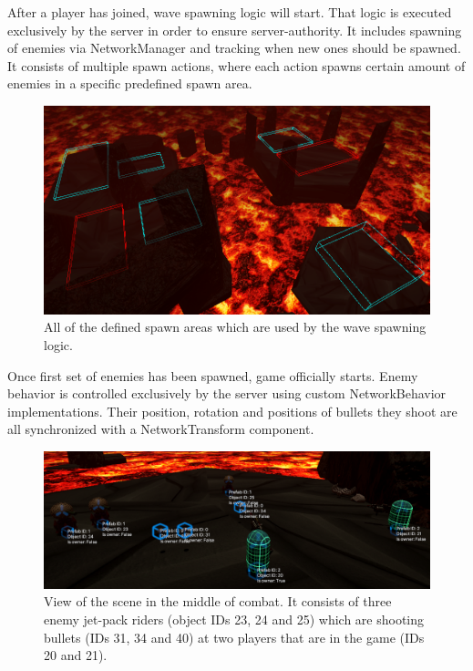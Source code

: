 \documentclass[times, utf8, diplomski]{fer}
\begin{document}
After a player has joined, wave spawning logic will start. That logic is executed exclusively by the server in order to ensure server-authority. It includes spawning of enemies via NetworkManager and tracking when new ones should be spawned. It consists of multiple spawn actions, where each action spawns certain amount of enemies in a specific predefined spawn area.\\

\begin{figure}[H]
	\centering
	\includegraphics[scale=0.58]{Game-spawn-areas}
	\caption{All of the defined spawn areas which are used by the wave spawning logic.}
\end{figure}

Once first set of enemies has been spawned, game officially starts. Enemy behavior is controlled exclusively by the server using custom NetworkBehavior implementations. Their position, rotation and positions of bullets they shoot are all synchronized with a NetworkTransform component.\\

\begin{figure}[H]
	\centering
	\includegraphics[scale=0.5]{Game-enemies-networked}
	\caption{View of the scene in the middle of combat. It consists of three enemy jet-pack riders (object IDs 23, 24 and 25) which are shooting bullets (IDs 31, 34 and 40) at two players that are in the game (IDs 20 and 21).}
\end{figure}
\end{document}
